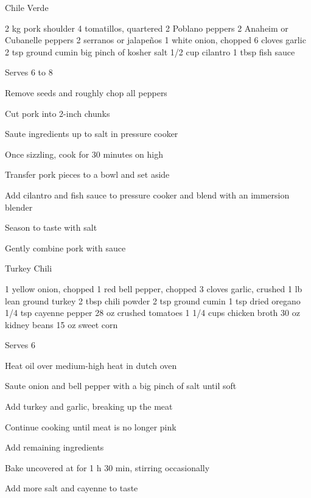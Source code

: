 \begin{denserecipe}{Chile Verde}{}
\begin{ingredients}
2 kg pork shoulder
4 tomatillos, quartered
2 Poblano peppers
2 Anaheim or Cubanelle peppers
2 serranos or jalapeños
1 white onion, chopped
6 cloves garlic
2 tsp ground cumin
big pinch of kosher salt
1/2 cup cilantro
1 tbsp fish sauce
\end{ingredients}
\nextcolumn
Serves 6 to 8
\begin{steps}
    \item Remove seeds and roughly chop all peppers
    \item Cut pork into 2-inch chunks
    \item Saute ingredients up to salt in pressure cooker
    \item Once sizzling, cook for 30 minutes on high
    \item Transfer pork pieces to a bowl and set aside
    \item Add cilantro and fish sauce to pressure cooker and blend with an immersion blender
    \item Season to taste with salt
    \item Gently combine pork with sauce
\end{steps}
\end{denserecipe}

\begin{denserecipe}{Turkey Chili}{}
\begin{ingredients}
1 yellow onion, chopped
1 red bell pepper, chopped
3 cloves garlic, crushed
1 lb lean ground turkey
2 tbsp chili powder
2 tsp ground cumin
1 tsp dried oregano
1/4 tsp cayenne pepper
28 oz crushed tomatoes
1 1/4 cups chicken broth
30 oz kidney beans
15 oz sweet corn
\end{ingredients}
\nextcolumn
Serves 6
\begin{steps}
    \item Heat oil over medium-high heat in dutch oven
    \item Saute onion and bell pepper with a big pinch of salt until soft
    \item Add turkey and garlic, breaking up the meat
    \item Continue cooking until meat is no longer pink
    \item Add remaining ingredients
    \item Bake uncovered at  for 1 h 30 min, stirring occasionally
    \item Add more salt and cayenne to taste
\end{steps}
\end{denserecipe}

